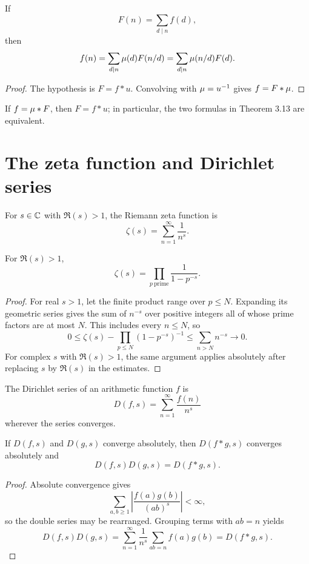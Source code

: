 \begin{thm}
If
\[
 F(n)=\sum_{d\mid n}f(d),
\]
then
\[
 f(n)=\sum_{d\mid n}\mu(d)F(n/d)
     =\sum_{d\mid n}\mu(n/d)F(d).
\]
\end{thm}
\begin{proof}
The hypothesis is $F=f*u$.  Convolving with $\mu=u^{-1}$ gives $f=F*\mu$.
\end{proof}

\begin{thm}
If $f=\mu*F$, then $F=f*u$; in particular, the two formulas in Theorem 3.13 are equivalent.
\end{thm}

\section{The zeta function and Dirichlet series}

\begin{de}
For $s\in\mathbb{C}$ with $\Re(s)>1$, the Riemann zeta function is
\[
 \zeta(s)=\sum_{n=1}^{\infty}\frac1{n^s}.
\]
\end{de}

\begin{thm}
For $\Re(s)>1$,
\[
 \zeta(s)=\prod_{p\ \mathrm{prime}}\frac1{1-p^{-s}}.
\]
\end{thm}
\begin{proof}
For real $s>1$, let the finite product range over $p\le N$.  Expanding its geometric series gives the sum of $n^{-s}$ over positive integers all of whose prime factors are at most $N$.  This includes every $n\le N$, so
\[
 0\le \zeta(s)-\prod_{p\le N}(1-p^{-s})^{-1}
 \le\sum_{n>N}n^{-s}\longrightarrow0.
\]
For complex $s$ with $\Re(s)>1$, the same argument applies absolutely after replacing $s$ by $\Re(s)$ in the estimates.
\end{proof}

\begin{de}
The Dirichlet series of an arithmetic function $f$ is
\[
 D(f,s)=\sum_{n=1}^{\infty}\frac{f(n)}{n^s}
\]
wherever the series converges.
\end{de}

\begin{thm}
If $D(f,s)$ and $D(g,s)$ converge absolutely, then $D(f*g,s)$ converges absolutely and
\[
 D(f,s)D(g,s)=D(f*g,s).
\]
\end{thm}
\begin{proof}
Absolute convergence gives
\[
 \sum_{a,b\ge1}\left|\frac{f(a)g(b)}{(ab)^s}\right|<\infty,
\]
so the double series may be rearranged.  Grouping terms with $ab=n$ yields
\[
 D(f,s)D(g,s)
 =\sum_{n=1}^{\infty}\frac1{n^s}\sum_{ab=n}f(a)g(b)
 =D(f*g,s).
\]
\end{proof}

